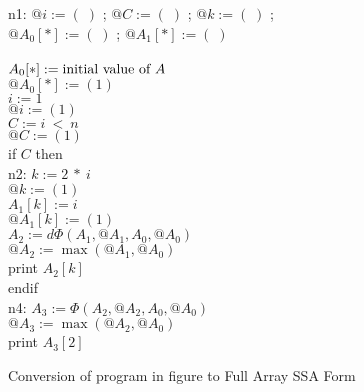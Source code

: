 \begin{figure}%
\begin{center}
\parbox{3.0in}{
\begin{programa}
\mbox{n1:}
\Tb $@i := (\;)$ ; $@C := (\;)$ ; $@k := (\;)$ ; \\
\Tb $@A_0[*] := (\;)$ ; $@A_1[*] := (\;)$\\
\\
\Tb $A_0[*] := \mbox{\rm initial value of $A$}$\\
\Tb $@A_0[*] := (1)$\\
\Tb $i := 1$ \\
\Tb $@i := (1)$ \\
\Tb $C := i\ <\ n $ \\
\Tb $@C := (1)$ \\
\Tb if $C$ then \\
\mbox{n2:}
\Tc $k :=  2\ *\ i$ \\
\Tc $@k := (1)$ \\
\Tc $A_1[k] := i$\\
\Tc $@A_1[k] := (1)$\\
\Tc $A_2 := d\Phi(A_1, @A_1, A_0, @A_0)$\\
\Tc $@A_2 := \max(@A_1, @A_0)$\\
\Tc print $A_2[k]$\\
\Tb endif \\
\mbox{n4:} 
\Tb $A_3 := \Phi(A_2, @A_2, A_0, @A_0)$\\
\Tb $@A_3 := \max(@A_2, @A_0)$\\
\Tb print $A_3[2]$ 
\end{programa}
}
\end{center}
\caption{Conversion of program in figure \protect{\ref{fig:ssa-acyclic-array}} to Full Array SSA Form}
\label{fig:full-form}
\end{figure}



